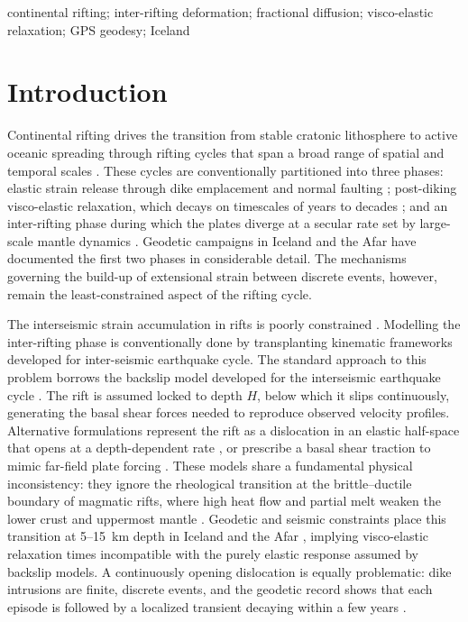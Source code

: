 \documentclass[extra]{gji}
\begin{document}
\begin{keywords}
continental rifting; inter-rifting deformation; fractional diffusion;
visco-elastic relaxation; GPS geodesy; Iceland
\end{keywords}

\section{Introduction}
\label{sec:intro}

Continental rifting drives the transition from stable cratonic lithosphere to active oceanic spreading through rifting cycles that span a broad range
of spatial and temporal scales \citep{corti2009continental,ebinger2013rifting}. These
cycles are conventionally partitioned into three phases: elastic strain
release through dike emplacement and normal faulting \citep{grandin2011seismicity,maccaferri2016time}; post-diking visco-elastic relaxation, which
decays on timescales of years to decades \citep{foulger1992post,nooner2009post}; and an inter-rifting phase during which the plates diverge at
a secular rate set by large-scale mantle dynamics \citep{saria2014present,stamps2021redefining}. Geodetic campaigns in Iceland \citep{heki1993plate,hofton1995horizontal} and the Afar \citep{vigny2007twenty,nooner2009post,grandin2011seismicity} have documented the first two phases in considerable detail. The
mechanisms governing the build-up of extensional strain between discrete
events, however, remain the least-constrained aspect of the rifting cycle.

The interseismic strain accumulation in rifts is poorly constrained \citep{ebinger2013rifting}.
Modelling the inter-rifting phase is conventionally done by transplanting kinematic frameworks developed for inter-seismic
earthquake cycle. 
The standard approach to this problem borrows the backslip model developed
for the interseismic earthquake cycle \citep{savage1978asthenosphere}. The rift
is assumed locked to depth $H$, below which it slips continuously,
generating the basal shear forces needed to reproduce observed velocity
profiles. Alternative formulations represent the rift as a
dislocation in an elastic half-space that opens at a depth-dependent rate
\citep{lafemina2005geodetic,konca2018slip}, or prescribe a basal shear
traction to mimic far-field plate forcing \citep{ali2014geodetic}. These models
share a fundamental physical inconsistency: they ignore the rheological
transition at the brittle--ductile boundary of magmatic rifts, where high
heat flow and partial melt weaken the lower crust and uppermost mantle
\citep{prodehl1997east,plasman2017lithospheric}. Geodetic and seismic
constraints place this transition at 5--15~km depth in Iceland and the
Afar \citep{stevens2021tectonic,weinstein2017fault}, implying visco-elastic
relaxation times incompatible with the purely elastic response assumed by
backslip models. A continuously opening dislocation is equally problematic:
dike intrusions are finite, discrete events, and the geodetic record shows
that each episode is followed by a localized transient decaying within a
few years \citep{foulger1992post,reiss2022shallow}.
\end{document}
